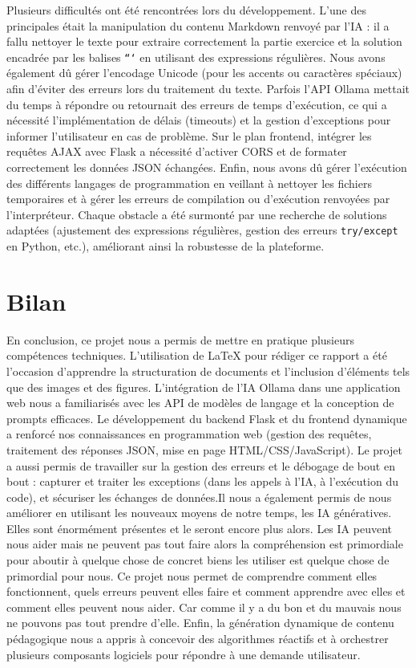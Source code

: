 \documentclass[a4paper, 12pt, twoside]{article}
\begin{document}
Plusieurs difficultés ont été rencontrées lors du développement. L'une des principales était la manipulation du contenu Markdown renvoyé par l'IA : il a fallu nettoyer le texte pour extraire correctement la partie exercice et la solution encadrée par les balises \texttt{```} en utilisant des expressions régulières. Nous avons également dû gérer l'encodage Unicode (pour les accents ou caractères spéciaux) afin d'éviter des erreurs lors du traitement du texte. Parfois l'API Ollama mettait du temps à répondre ou retournait des erreurs de temps d'exécution, ce qui a nécessité l'implémentation de délais (timeouts) et la gestion d'exceptions pour informer l'utilisateur en cas de problème. Sur le plan frontend, intégrer les requêtes AJAX avec Flask a nécessité d'activer CORS et de formater correctement les données JSON échangées. Enfin, nous avons dû gérer l'exécution des différents langages de programmation en veillant à nettoyer les fichiers temporaires et à gérer les erreurs de compilation ou d'exécution renvoyées par l'interpréteur. Chaque obstacle a été surmonté par une recherche de solutions adaptées (ajustement des expressions régulières, gestion des erreurs \texttt{try/except} en Python, etc.), améliorant ainsi la robustesse de la plateforme.

\section{Bilan}

En conclusion, ce projet nous a permis de mettre en pratique plusieurs compétences techniques. L'utilisation de LaTeX pour rédiger ce rapport a été l'occasion d'apprendre la structuration de documents et l'inclusion d'éléments tels que des images et des figures. L'intégration de l'IA Ollama dans une application web nous a familiarisés avec les API de modèles de langage et la conception de prompts efficaces. Le développement du backend Flask et du frontend dynamique a renforcé nos connaissances en programmation web (gestion des requêtes, traitement des réponses JSON, mise en page HTML/CSS/JavaScript). Le projet a aussi permis de travailler sur la gestion des erreurs et le débogage de bout en bout : capturer et traiter les exceptions (dans les appels à l'IA, à l'exécution du code), et sécuriser les échanges de données.Il nous a également permis de nous améliorer en utilisant les nouveaux moyens de notre temps, les IA génératives. Elles sont énormément présentes et le seront encore plus alors. Les IA peuvent nous aider mais ne peuvent pas tout faire alors la compréhension est primordiale pour aboutir à quelque chose de concret biens les utiliser est quelque chose de primordial pour nous. Ce projet nous permet de comprendre comment elles fonctionnent, quels erreurs peuvent elles faire et comment apprendre avec elles et comment elles peuvent nous aider. Car comme il y a du bon et du mauvais nous ne pouvons pas tout prendre d’elle. Enfin, la génération dynamique de contenu pédagogique nous a appris à concevoir des algorithmes réactifs et à orchestrer plusieurs composants logiciels pour répondre à une demande utilisateur.
\end{document}
